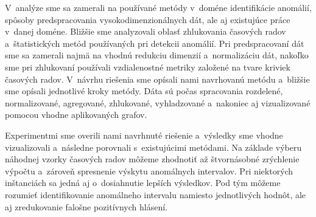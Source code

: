 \documentclass[a4paper,twoside,slovak,12pt,appendix]{article}
\begin{document}
V~analýze sme sa zamerali na používané metódy v~doméne identifikácie anomálií,
spôsoby predspracovania vysokodimenzionálnych dát, ale aj existujúce práce
v~danej doméne. Bližšie sme analyzovali oblasť zhlukovania časových radov
a~štatistických metód používaných pri detekcii anomálií. Pri predspracovaní dát
sme sa zamerali najmä na vhodnú redukciu dimenzií a~normalizáciu dát, nakoľko
sme pri zhlukovaní používali vzdialenostné metriky založené na tvare kriviek
časových radov. V~návrhu riešenia sme opísali nami navrhovanú metódu a~bližšie
sme opísali jednotlivé kroky metódy. Dáta sú počas spracovania rozdelené,
normalizované, agregované, zhlukované, vyhladzované a~nakoniec aj vizualizované
pomocou vhodne aplikovaných grafov.

Experimentmi sme overili nami navrhnuté riešenie a~výsledky sme vhodne
vizualizovali a~následne porovnali s~existujúcimi metódami. Na základe výberu
náhodnej vzorky časových radov môžeme zhodnotiť až štvornásobné zrýchlenie
výpočtu a~zároveň spresnenie výskytu anomálnych intervalov. Pri niektorých
inštanciách sa jedná aj o~dosiahnutie lepších výsledkov. Pod tým môžeme rozumieť
identifikovanie anomálneho intervalu namiesto jednotlivých hodnôt, ale aj
zredukovanie falošne pozitívnych hlásení.


\newpage\null\thispagestyle{empty}\newpage
{}



\end{document}
